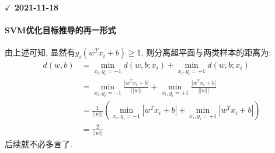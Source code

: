 \textbf{$\checkmark$ 2021-11-18}\\
\paragraph{SVM优化目标推导的再一形式}
由上述可知, 显然有$y_i ( w^T x_i + b ) \geq 1$, 则分离超平面与两类样本的距离为: 
\begin{align}
	d(w, b) &= \mathop{min}_{x_i, y_i=-1} d(w, b; x_i) + \mathop{min}_{x_i, y_i=+1} d(w, b; x_i) \nonumber \\
			&= 	\mathop{min}_{x_i, y_i=-1} \frac{|w^T x_i + b|}{||w||} + \mathop{min}_{x_i, y_i=+1} \frac{|w^T x_i + b|}{||w||} \nonumber \\
			&= \frac{1}{||w||} ( \mathop{min}_{x_i, y_i=-1} |w^T x_i + b| + \mathop{min}_{x_i, y_i=+1} |w^T x_i + b|) \nonumber \\
			&= \frac{2}{||w||}
\end{align}
后续就不必多言了. 



